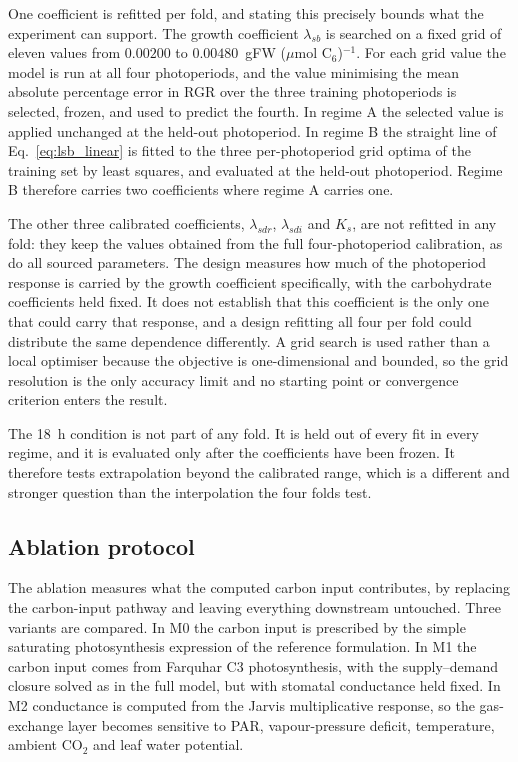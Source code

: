 One coefficient is refitted per fold, and stating this precisely bounds what the
experiment can support. The growth coefficient $\lambda_{sb}$ is searched on a
fixed grid of eleven values from $0.00200$ to $0.00480$~gFW ($\mu$mol
C$_6$)$^{-1}$. For each grid value the model is run at all four
photoperiods, and the value minimising the mean absolute percentage error in RGR
over the three training photoperiods is selected, frozen, and used to predict the
fourth. In regime A the selected value is applied unchanged at the held-out
photoperiod. In regime B the straight line of Eq.~\eqref{eq:lsb_linear}
is fitted to the three per-photoperiod grid optima of the training set by least
squares, and evaluated at the held-out photoperiod. Regime B therefore carries two coefficients where regime A carries
one.

The other three calibrated coefficients, $\lambda_{sdr}$, $\lambda_{sdi}$ and
$K_s$, are not refitted in any fold: they keep the values obtained from the
full four-photoperiod calibration, as do all sourced parameters. The design
measures how much of the photoperiod response is carried by the growth
coefficient specifically, with the carbohydrate coefficients held fixed. It does
not establish that this coefficient is the only one that could carry that
response, and a design refitting all four per fold could distribute the same
dependence differently. A grid search is used rather than a local optimiser
because the objective is one-dimensional and bounded, so the grid resolution is
the only accuracy limit and no starting point or convergence criterion enters
the result.

The 18~h condition is not part of any fold. It is held out of every fit in
every regime, and it is evaluated only after the coefficients have been frozen.
It therefore tests extrapolation beyond the calibrated range, which is a
different and stronger question than the interpolation the four folds test.

\subsection{Ablation protocol}

The ablation measures what the computed carbon input contributes, by replacing
the carbon-input pathway and leaving everything downstream untouched. Three
variants are compared. In M0 the carbon input is prescribed by the simple
saturating photosynthesis expression of the reference formulation. In M1 the
carbon input comes from Farquhar C3 photosynthesis, with the supply--demand
closure solved as in the full model, but with stomatal conductance held fixed.
In M2 conductance is computed from the Jarvis multiplicative response, so the
gas-exchange layer becomes sensitive to PAR, vapour-pressure deficit,
temperature, ambient CO$_2$ and leaf water potential.

